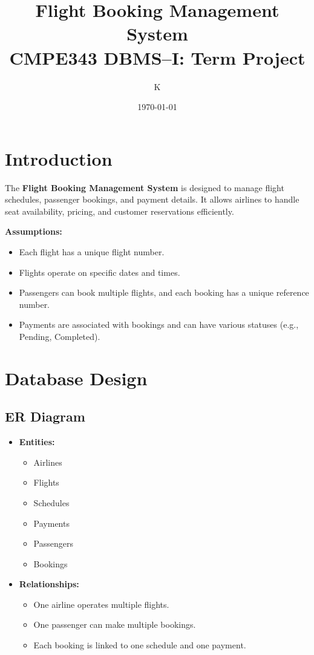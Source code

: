 \documentclass[14pt,a4paper]{extarticle}
\title{\textbf{Flight Booking Management System}\\
       \large CMPE343 DBMS--I: Term Project}
\author{
    K
}
\date{\today}
\begin{document}
\maketitle
\tableofcontents

\newpage

\section{Introduction}

The \textbf{Flight Booking Management System} is designed to manage flight schedules, passenger bookings, and payment details. It allows airlines to handle seat availability, pricing, and customer reservations efficiently.

\textbf{Assumptions:}
\begin{itemize}
    \item Each flight has a unique flight number.
    \item Flights operate on specific dates and times.
    \item Passengers can book multiple flights, and each booking has a unique reference number.
    \item Payments are associated with bookings and can have various statuses (e.g., Pending, Completed).
\end{itemize}

\newpage

\section{Database Design}

\subsection{ER Diagram}

\begin{itemize}
    \item \textbf{Entities:}
    \begin{itemize}
    \item Airlines
    \item Flights
    \item Schedules
    \item Payments
    \item Passengers
    \item Bookings
    \end{itemize}
    \item \textbf{Relationships:}
        \begin{itemize}
            \item One airline operates multiple flights.
            \item One passenger can make multiple bookings.
            \item Each booking is linked to one schedule and one payment.
        \end{itemize}
\end{itemize}
\end{document}
